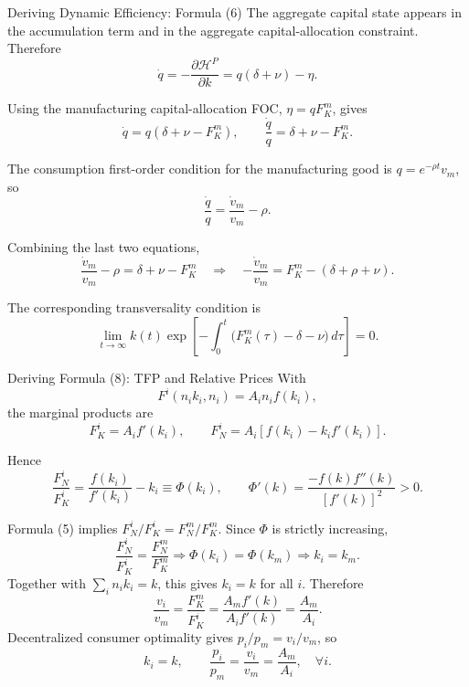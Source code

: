 \begin{frame}[label=appendixdynamic]{Deriving Dynamic Efficiency: Formula (6)}
  \scriptsize
  The aggregate capital state appears in the accumulation term and in the
  aggregate capital-allocation constraint. Therefore
  \[
    \dot q=-\frac{\partial\mathcal H^P}{\partial k}
    =q(\delta+\nu)-\eta .
  \]

  Using the manufacturing capital-allocation FOC, $\eta=qF_K^m$, gives
  \[
    \dot q=q(\delta+\nu-F_K^m),
    \qquad
    \frac{\dot q}{q}=\delta+\nu-F_K^m .
  \]

  The consumption first-order condition for the manufacturing good is
  $q=e^{-\rho t}v_m$, so
  \[
    \frac{\dot q}{q}
    =
    \frac{\dot v_m}{v_m}-\rho .
  \]

  Combining the last two equations,
  \[
    \frac{\dot v_m}{v_m}-\rho
    =
    \delta+\nu-F_K^m
    \quad\Longrightarrow\quad
    \boxed{
      -\frac{\dot v_m}{v_m}
      =
      F_K^m-(\delta+\rho+\nu)
    }.
  \]

  \vspace{-0.04cm}
  The corresponding transversality condition is
  \[
    \lim_{t\to\infty}
    k(t)\exp\!\left[-\int_0^t
    \bigl(F_K^m(\tau)-\delta-\nu\bigr)\,d\tau\right]=0 .
  \]

  \hyperlink{efficiencycondition}{}
\end{frame}

\begin{frame}[label=appendixtfp]{Deriving Formula (8): TFP and Relative Prices}
  \scriptsize
  With
  \[
    F^i(n_ik_i,n_i)=A_in_if(k_i),
  \]
  the marginal products are
  \[
    F_K^i=A_if'(k_i),\qquad
    F_N^i=A_i\left[f(k_i)-k_if'(k_i)\right].
  \]

  Hence
  \[
    \frac{F_N^i}{F_K^i}
    =
    \frac{f(k_i)}{f'(k_i)}-k_i
    \equiv \Phi(k_i),
    \qquad
    \Phi'(k)=\frac{-f(k)f''(k)}{[f'(k)]^2}>0 .
  \]

  Formula (5) implies $F_N^i/F_K^i=F_N^m/F_K^m$. Since $\Phi$ is strictly
  increasing,
  \[
    \frac{F_N^i}{F_K^i}
    =
    \frac{F_N^m}{F_K^m}
    \Longrightarrow
    \Phi(k_i)=\Phi(k_m)
    \Longrightarrow
    k_i=k_m.
  \]
  Together with $\sum_i n_ik_i=k$, this gives $k_i=k$ for all $i$. Therefore
  \[
    \frac{v_i}{v_m}
    =
    \frac{F_K^m}{F_K^i}
    =
    \frac{A_mf'(k)}{A_if'(k)}
    =
    \frac{A_m}{A_i}.
  \]
  Decentralized consumer optimality gives $p_i/p_m=v_i/v_m$, so
  \[
    \boxed{
    k_i=k,\qquad
    \frac{p_i}{p_m}=\frac{v_i}{v_m}=\frac{A_m}{A_i},
    \quad \forall i
    }.
  \]

  \hyperlink{tfpprices}{}
\end{frame}

